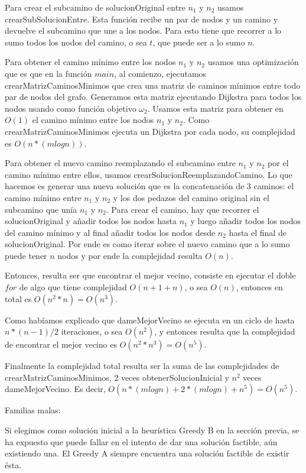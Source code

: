 Para crear el subcamino de solucionOriginal entre $n_1$ y $n_2$ usamos crearSubSolucionEntre. Esta función recibe un par de nodos y un camino y devuelve el subcamino que une a los nodos. Para esto tiene que recorrer a lo sumo todos los nodos del camino, o sea $t$, que puede ser a lo sumo $n$.

Para obtener el camino mínimo entre los nodos $n_1$ y $n_2$ usamos una optimización que es que en la función $main$, al comienzo, ejecutamos crearMatrizCaminosMinimos que crea una matriz de caminos mínimos entre todo par de nodos del grafo. Generamos esta matriz ejecutando Dijkstra para todos los nodos usando como función objetivo $\omega_2$. Usamos esta matriz para obtener en $O(1)$ el camino mínimo entre los nodos $n_1$ y $n_2$.
Como crearMatrizCaminosMinimos ejecuta un Dijkstra por cada nodo, su complejidad es $O(n * (m log n))$.

Para obtener el nuevo camino reemplazando el subcamino entre $n_1$ y $n_2$ por el camino mínimo entre ellos, usamos crearSolucionReemplazandoCamino.
Lo que hacemos es generar una nueva solución que es la concatenación de 3 caminos: el camino mínimo entre $n_1$ y $n_2$ y los dos pedazos del camino original sin el subcamino que unía $n_1$ y $n_2$. Para crear el camino, hay que recorrer el solucionOriginal y añadir todos los nodos hasta $n_1$ y luego añadir todos los nodos del camino mínimo y al final añadir todos los nodos desde $n_2$ hasta el final de solucionOriginal. Por ende es como iterar sobre el nuevo camino que a lo sumo puede tener $n$ nodos y por ende la complejidad resulta $O(n)$.

Entonces, resulta ser que encontrar el mejor vecino, consiste en ejecutar el doble $for$ de algo que tiene complejidad $O(n + 1 + n)$, o sea $O(n)$, entonces en total es $O(n^2 * n) = O(n^3)$.

Como habíamos explicado que dameMejorVecino se ejecuta en un ciclo de hasta $n * (n-1) / 2$ iteraciones, o sea $O(n^2)$, y entonces resulta que la complejidad de encontrar el mejor vecino es $O(n^2 * n^3) = O(n^5)$. 

Finalmente la complejidad total resulta ser la suma de las complejidades de crearMatrizCaminosMinimos, 2 veces obtenerSolucionInicial y $n^2$ veces dameMejorVecino. Es decir, $O(n * (m log n) + 2 * (m log n) + n^5) = O(n^5)$.

Familias malas:

Si elegimos como solución inicial a la heurística Greedy B en la sección previa, se ha expuesto que puede fallar en el intento de dar una solución factible, aún existiendo una. El Greedy A siempre encuentra una solución factible de existir ésta. 

